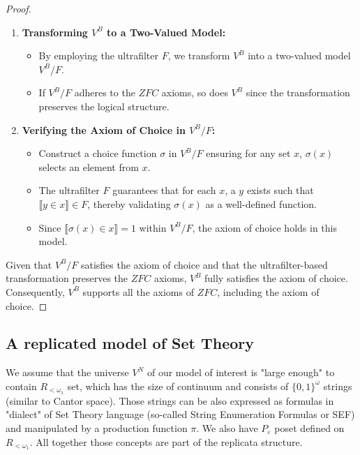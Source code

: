 \begin{proof}
\begin{enumerate}
    \item \textbf{Transforming \( V^B \) to a Two-Valued Model:}
    \begin{itemize}
        \item By employing the ultrafilter \( F \), we transform \( V^B \) into a two-valued model \( V^B/F \).
        \item If \( V^B/F \) adheres to the $ZFC$ axioms, so does \( V^B \) since the transformation preserves the logical structure.
    \end{itemize}

    \item \textbf{Verifying the Axiom of Choice in \( V^B/F \):}
    \begin{itemize}
        \item Construct a choice function \( \sigma \) in \( V^B/F \) ensuring for any set \( x \), \( \sigma(x) \) selects an element from \( x \).
        \item The ultrafilter \( F \) guarantees that for each \( x \), a \( y \) exists such that \( \llbracket y \in x \rrbracket \in F \), thereby validating \( \sigma(x) \) as a well-defined function.
        \item Since \( \llbracket \sigma(x) \in x \rrbracket = 1 \) within \( V^B/F \), the axiom of choice holds in this model.
    \end{itemize}
\end{enumerate}

Given that \( V^B/F \) satisfies the axiom of choice and that the ultrafilter-based transformation preserves the $ZFC$ axioms, \( V^B \) fully satisfies the axiom of choice. Consequently, \( V^B \) supports all the axioms of $ZFC$, including the axiom of choice.

\end{proof}

\subsection{A replicated model of Set Theory}\label{subsection_rep_model}

We assume that the universe $V^N$ of our model of interest is "large enough" to contain $R_{<\omega_1}$ set, which has the size of continuum and consists of $\{0,1\}^\omega$ strings (similar to Cantor space). Those strings can be also expressed as formulas in "dialect" of Set Theory language (so-called String Enumeration Formulas or SEF) and manipulated by a production function $\pi$. We also have $P_\varepsilon$ poset defined on $R_{<\omega_1}$. All together those concepts are part of the replicata structure.

